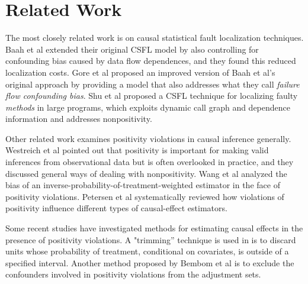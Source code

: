 \section{Related Work}
The most closely related work is on causal statistical fault localization techniques.  Baah et al \cite{baah2011mitigating} extended their original CSFL model by also controlling for confounding bias caused by data flow dependences, and they found this reduced localization costs.  Gore et al \cite{gore2012reducing} proposed an improved version of Baah et al’s original approach by providing a model that also addresses what they call {\it failure flow confounding bias}.  Shu et al \cite{shu2013mfl} proposed a CSFL technique for localizing faulty {\it methods} in large programs, which exploits dynamic call graph and dependence information and addresses nonpositivity.

Other related work examines positivity violations in causal inference generally.  Westreich et al \cite{westreich2010invited} pointed out that positivity is important for making valid inferences from observational data but is often overlooked in practice, and they discussed general ways of dealing with nonpositivity.  Wang et al \cite{wang2006diagnosing} analyzed the bias of an inverse-probability-of-treatment-weighted estimator in the face of positivity violations.  Petersen et al \cite{petersen2010diagnosing} systematically reviewed how violations of positivity influence different types of causal-effect estimators.

Some recent studies have investigated methods for estimating causal effects in the presence of positivity violations. A "trimming” technique is used in \cite{crump2006moving} is to discard units whose probability of treatment, conditional on covariates, is outside of a specified interval.  Another method proposed by Bembom et al  \cite{bembom2008data} is to exclude the confounders involved in positivity violations from the adjustment sets.  

